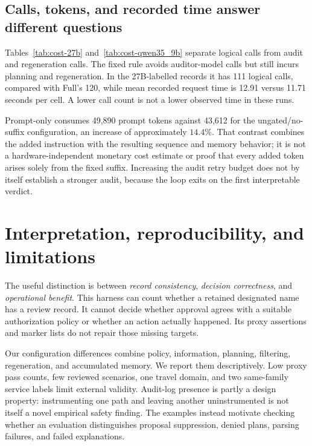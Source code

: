 \documentclass[11pt]{article}
\begin{document}
\subsection{Calls, tokens, and recorded time answer different questions}
Tables~\ref{tab:cost-27b} and~\ref{tab:cost-qwen35_9b} separate logical calls from audit
and regeneration calls. The fixed rule avoids auditor-model calls but still incurs
planning and regeneration. In the 27B-labelled records it has 111 logical calls,
compared with Full's 120, while mean recorded request time is 12.91 versus 11.71
seconds per cell. A lower call count is not a lower observed time in these runs.

Prompt-only consumes 49,890 prompt tokens against 43,612 for the ungated/no-suffix
configuration, an increase of approximately $14.4\%$. That contrast combines the
added instruction with the resulting sequence and memory behavior; it is not a
hardware-independent monetary cost estimate or proof that every added token arises
solely from the fixed suffix. Increasing the audit retry budget does not by itself
establish a stronger audit, because the loop exits on the first interpretable verdict.

\section{Interpretation, reproducibility, and limitations}
The useful distinction is between \emph{record consistency}, \emph{decision correctness},
and \emph{operational benefit}. This harness can count whether a retained designated
name has a review record. It cannot decide whether approval agrees with a suitable
authorization policy or whether an action actually happened. Its proxy assertions and
marker lists do not repair those missing targets.

Our configuration differences combine policy, information, planning, filtering,
regeneration, and accumulated memory. We report them descriptively. Low proxy pass
counts, few reviewed scenarios, one travel domain, and two same-family service labels
limit external validity. Audit-log presence is partly a design property: instrumenting
one path and leaving another uninstrumented is not itself a novel empirical safety
finding. The examples instead motivate checking whether an evaluation distinguishes
proposal suppression, denied plans, parsing failures, and failed explanations.
\end{document}
